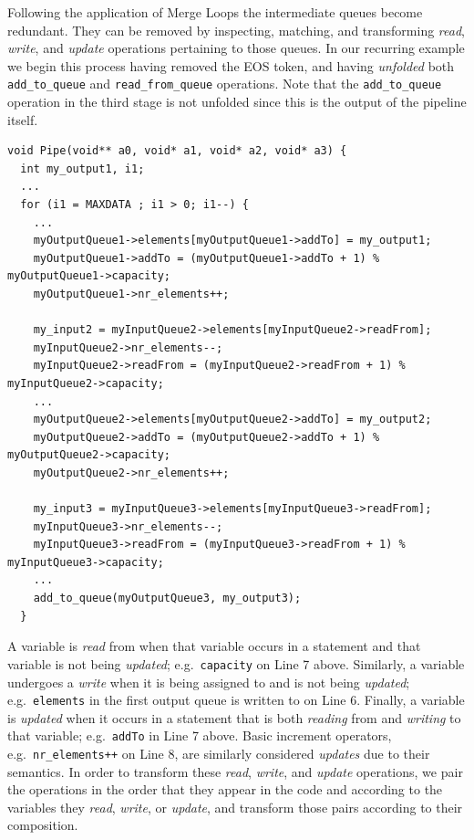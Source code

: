 Following the application of Merge Loops the intermediate queues become redundant.
%
They can be removed by inspecting, matching, and transforming \emph{read}, \emph{write}, and \emph{update} operations pertaining to those queues.
%
In our recurring example we begin this process having removed the EOS token, and having \emph{unfolded} both \lstinline|add_to_queue| and \lstinline|read_from_queue| operations. Note that the \lstinline|add_to_queue| operation in the third stage is not unfolded since this is the output of the pipeline itself.
%
\begin{lstlisting}[frame=single]
void Pipe(void** a0, void* a1, void* a2, void* a3) {
  int my_output1, i1;
  ...
  for (i1 = MAXDATA ; i1 > 0; i1--) {
    ...
    myOutputQueue1->elements[myOutputQueue1->addTo] = my_output1;
    myOutputQueue1->addTo = (myOutputQueue1->addTo + 1) % myOutputQueue1->capacity;
    myOutputQueue1->nr_elements++;

    my_input2 = myInputQueue2->elements[myInputQueue2->readFrom];
    myInputQueue2->nr_elements--;
    myInputQueue2->readFrom = (myInputQueue2->readFrom + 1) % myInputQueue2->capacity;
    ...
    myOutputQueue2->elements[myOutputQueue2->addTo] = my_output2;
    myOutputQueue2->addTo = (myOutputQueue2->addTo + 1) % myOutputQueue2->capacity;
    myOutputQueue2->nr_elements++;

    my_input3 = myInputQueue3->elements[myInputQueue3->readFrom];
    myInputQueue3->nr_elements--;
    myInputQueue3->readFrom = (myInputQueue3->readFrom + 1) % myInputQueue3->capacity;
    ...
    add_to_queue(myOutputQueue3, my_output3);
  }
\end{lstlisting}
%
A variable is \emph{read} from when that variable occurs in a statement and that variable is not being \emph{updated}; e.g.\ \lstinline|capacity| on Line 7 above.
%
Similarly, a variable undergoes a \emph{write} when it is being assigned to and is not being \emph{updated}; e.g.\ \lstinline|elements|
in the first output queue is written to on Line 6.
%
Finally, a variable is \emph{updated} when it occurs in a statement that is both \emph{reading} from and \emph{writing} to that variable; e.g.\  \lstinline|addTo| in Line 7 above. Basic increment operators, e.g.\  \lstinline|nr_elements++| on Line 8, are similarly considered \emph{updates} due to their semantics.
%
%
In order to transform these \emph{read}, \emph{write}, and \emph{update} operations, we pair the operations in the order that they appear in the code and according to the variables they \emph{read}, \emph{write}, or \emph{update}, and transform those pairs according to their composition.
